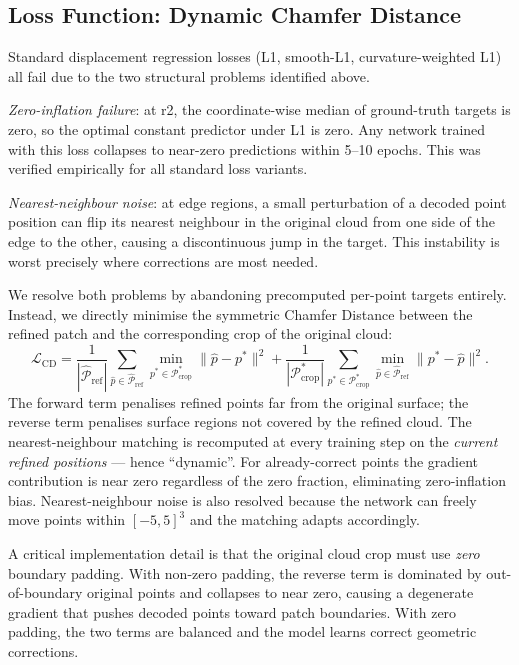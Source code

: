 \subsection*{Loss Function: Dynamic Chamfer Distance}

Standard displacement regression losses (L1, smooth-L1, curvature-weighted L1)
all fail due to the two structural problems identified above.

\emph{Zero-inflation failure}: at r2, the coordinate-wise median of ground-truth
targets is zero, so the optimal constant predictor under L1 is zero.
Any network trained with this loss collapses to near-zero predictions within
5--10 epochs.
This was verified empirically for all standard loss variants.

\emph{Nearest-neighbour noise}: at edge regions, a small perturbation of a
decoded point position can flip its nearest neighbour in the original cloud
from one side of the edge to the other, causing a discontinuous jump in the
target.
This instability is worst precisely where corrections are most needed.

We resolve both problems by abandoning precomputed per-point targets entirely.
Instead, we directly minimise the symmetric Chamfer Distance between the
refined patch and the corresponding crop of the original cloud:
\[
  \mathcal{L}_{\mathrm{CD}} =
    \frac{1}{|\hat{\mathcal{P}}_{\mathrm{ref}}|}
    \sum_{\hat{p} \in \hat{\mathcal{P}}_{\mathrm{ref}}}
      \min_{p^* \in \mathcal{P}^*_{\mathrm{crop}}} \|\hat{p} - p^*\|^2
    +
    \frac{1}{|\mathcal{P}^*_{\mathrm{crop}}|}
    \sum_{p^* \in \mathcal{P}^*_{\mathrm{crop}}}
      \min_{\hat{p} \in \hat{\mathcal{P}}_{\mathrm{ref}}} \|p^* - \hat{p}\|^2.
\]
The forward term penalises refined points far from the original surface;
the reverse term penalises surface regions not covered by the refined cloud.
The nearest-neighbour matching is recomputed at every training step on the
\emph{current refined positions} --- hence ``dynamic''.
For already-correct points the gradient contribution is near zero regardless
of the zero fraction, eliminating zero-inflation bias.
Nearest-neighbour noise is also resolved because the network can freely move
points within $[-5,5]^3$ and the matching adapts accordingly.

A critical implementation detail is that the original cloud crop must use
\emph{zero} boundary padding.
With non-zero padding, the reverse term is dominated by out-of-boundary
original points and collapses to near zero, causing a degenerate gradient that
pushes decoded points toward patch boundaries.
With zero padding, the two terms are balanced and the model learns correct
geometric corrections.

